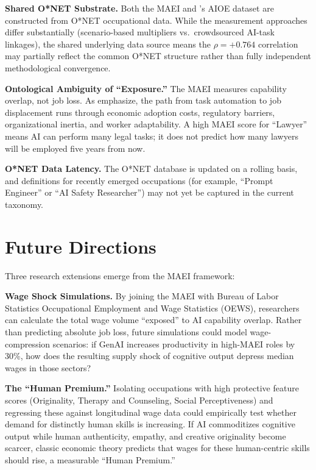 \textbf{Shared O*NET Substrate.}
Both the MAEI and \citet{Felten_Raj_Seamans_2021}'s AIOE dataset are constructed
from O*NET occupational data.  While the measurement approaches differ
substantially (scenario-based multipliers vs.\ crowdsourced AI-task linkages),
the shared underlying data source means the $\rho = +0.764$ correlation may
partially reflect the common O*NET structure rather than fully independent
methodological convergence.

\textbf{Ontological Ambiguity of ``Exposure.''}
The MAEI measures capability overlap, not job loss.  As
\citet{Acemoglu_Restrepo_2018} emphasize, the path from task automation to job
displacement runs through economic adoption costs, regulatory barriers,
organizational inertia, and worker adaptability.  A high MAEI score for
``Lawyer'' means AI can perform many legal tasks; it does not predict how many
lawyers will be employed five years from now.

\textbf{O*NET Data Latency.}
The O*NET database is updated on a rolling basis, and definitions for recently
emerged occupations (for example, ``Prompt Engineer'' or ``AI Safety
Researcher'') may not yet be captured in the current taxonomy.

\section{Future Directions}
\label{sec:future_directions}

Three research extensions emerge from the MAEI framework:

\textbf{Wage Shock Simulations.}
By joining the MAEI with Bureau of Labor Statistics Occupational Employment and
Wage Statistics (OEWS), researchers can calculate the total wage volume
``exposed'' to AI capability overlap.  Rather than predicting absolute job loss,
future simulations could model wage-compression scenarios: if GenAI increases
productivity in high-MAEI roles by 30\%, how does the resulting supply shock of
cognitive output depress median wages in those sectors?

\textbf{The ``Human Premium.''}
Isolating occupations with high protective feature scores (Originality, Therapy
and Counseling, Social Perceptiveness) and regressing these against longitudinal
wage data could empirically test whether demand for distinctly human skills is
increasing.  If AI commoditizes cognitive output while human authenticity,
empathy, and creative originality become scarcer, classic economic theory predicts
that wages for these human-centric skills should rise, a measurable ``Human
Premium.''

